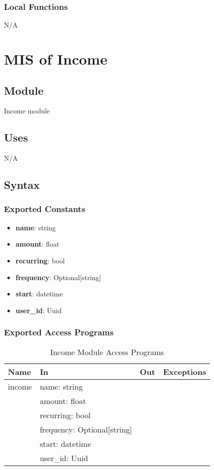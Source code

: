 \documentclass[12pt, titlepage]{article}
\begin{document}
\subsubsection{Local Functions}
N/A

\newpage

\section{MIS of Income}\label{income_module}

\subsection{Module}

Income module

\subsection{Uses}
N/A

\subsection{Syntax}

\subsubsection{Exported Constants}
\begin{itemize}
  \item \textbf{name}: string
  \item \textbf{amount}: float
  \item \textbf{recurring}: bool
  \item \textbf{frequency}: Optional[string]
  \item \textbf{start}: datetime
  \item \textbf{user\_id}: Uuid
\end{itemize}

\subsubsection{Exported Access Programs}

\begin{center}
  \begin{table}[H]
    \caption{Income Module Access Programs}
\begin{tabular}{p{4cm} p{4cm} p{4cm} p{4cm}}
\hline
\textbf{Name} & \textbf{In} & \textbf{Out} & \textbf{Exceptions} \\
\hline
income & name: string &  &  \\
  & amount: float &  &  \\
  & recurring: bool &  &  \\
  & frequency: Optional[string] &  &  \\
  & start: datetime &  &  \\
  & user\_id: Uuid &  &  \\
\hline
\end{tabular}
\end{table}
\end{center}
\end{document}

